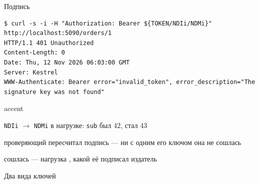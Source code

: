 \documentclass[aspectratio=169,10pt,t]{beamer}
\newcommand{\termsm}{\ttfamily\fontsize{6.6}{7.9}\selectfont}
\begin{document}
\begin{frame}[plain]
\end{frame}

\begin{frame}[fragile]{Подпись}
  \slidetop

\begin{lstlisting}[style=term,basicstyle=\termsm]
$ curl -s -i -H "Authorization: Bearer ${TOKEN/NDIi/NDMi}" http://localhost:5090/orders/1
HTTP/1.1 401 Unauthorized
Content-Length: 0
Date: Thu, 12 Nov 2026 06:03:00 GMT
Server: Kestrel
WWW-Authenticate: Bearer error="invalid_token", error_description="The signature key was not found"
\end{lstlisting}

  \begin{cbul}{accent}
    \item \texttt{NDIi} $\to$ \texttt{NDMi} в нагрузке: \texttt{sub} был 42, стал 43
    \item проверяющий пересчитал подпись --- ни с одним его ключом она не сошлась
    \item сошлась --- нагрузка , какой её подписал издатель
  \end{cbul}
\end{frame}

\begin{frame}{Два вида ключей}
  \slidetop

  \slidegap
\end{frame}
\end{document}
